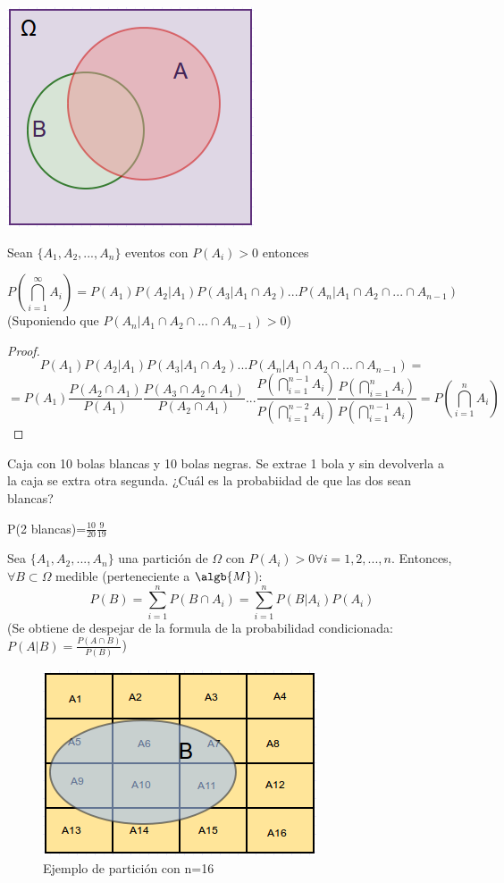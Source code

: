 \documentclass{apuntes}
\begin{document}
\begin{center}
\includegraphics[scale=0.75]{img/Dvenn1.png}
\end{center}

\begin{defn}
Sean $\{A_1, A_2,...,A_n\}$ eventos con $P(A_i)>0$ entonces

\[
P(\bigcap_{i=1}^{\infty}A_i) = P(A_1)P(A_2|A_1)P(A_3|A_1\cap A_2)...P(A_n|A_1\cap A_2\cap ... \cap A_{n-1})
\]
(Suponiendo que $P(A_n|A_1\cap A_2\cap ... \cap A_{n-1})>0$)
\begin{proof}
\[
P(A_1)P(A_2|A_1)P(A_3|A_1\cap A_2)...P(A_n|A_1\cap A_2\cap ... \cap A_{n-1})=
\]
\[
=P(A_1)\frac{P(A_2\cap A_1)}{P(A_1)}\frac{P(A_3\cap A_2\cap A_1)}{P(A_2\cap A_1)}...\frac{P(\bigcap_{i=1}^{n-1}A_i)}{P(\bigcap_{i=1}^{n-2}A_i)}\frac{P(\bigcap_{i=1}^{n}A_i)}{P(\bigcap_{i=1}^{n-1}A_i)} = P(\bigcap_{i=1}^{n}A_i)
\]
\end{proof}
\end{defn}
\begin{example}
Caja con 10 bolas blancas y 10 bolas negras. Se extrae 1 bola y sin devolverla a la caja se extra otra segunda. ¿Cuál es la probabiidad de que las dos sean blancas?

P(2 blancas)=$\frac{10}{20}\frac{9}{19}$
\end{example}

\begin{defn}
Sea  $\{A_1, A_2,...,A_n\}$ una partición de $\Omega$ con $P(A_i)>0 \forall i=1,2,...,n$. Entonces, $\forall B \subset \Omega$ medible (perteneciente a $\algb{M}$):
\[
P(B)=\sum_{i=1}^{n}P(B\cap A_i)=\sum_{i=1}^{n}P(B|A_i)P(A_i)
\]
(Se obtiene de despejar de la formula de la probabilidad condicionada: $P(A|B)=\frac{P(A \cap B)}{P(B)}$)
\end{defn}

\begin{figure}[h]
\centering
\includegraphics[page=1,scale=0.745]{img/Dvenn2.png}
\caption{Ejemplo de partición con n=16}
\end{figure}
\end{document}
